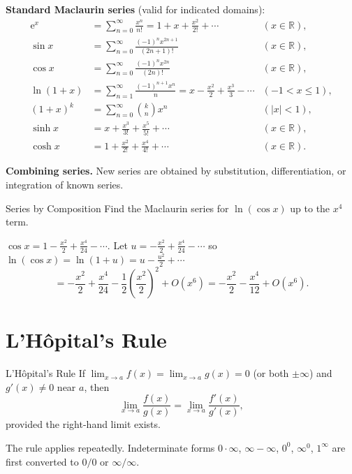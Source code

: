 \documentclass[12pt, a4paper]{book}
\newenvironment{keyresult}{%
  \begin{tcolorbox}[keystyle]%
}{%
  \end{tcolorbox}%
}
\newcommand{\R}{\mathbb{R}}
\newcommand{\e}{\mathrm{e}}
\begin{document}
\begin{keyresult}
\textbf{Standard Maclaurin series} (valid for indicated domains):
\begin{align*}
\e^x &= \sum_{n=0}^{\infty}\frac{x^n}{n!} = 1+x+\frac{x^2}{2!}+\cdots & (x\in\R),\\
\sin x &= \sum_{n=0}^{\infty}\frac{(-1)^n x^{2n+1}}{(2n+1)!} & (x\in\R),\\
\cos x &= \sum_{n=0}^{\infty}\frac{(-1)^n x^{2n}}{(2n)!} & (x\in\R),\\
\ln(1+x) &= \sum_{n=1}^{\infty}\frac{(-1)^{n+1}x^n}{n} = x-\frac{x^2}{2}+\frac{x^3}{3}-\cdots & (-1<x\leq 1),\\
(1+x)^k &= \sum_{n=0}^{\infty}\binom{k}{n}x^n & (|x|<1),\\
\sinh x &= x+\frac{x^3}{3!}+\frac{x^5}{5!}+\cdots & (x\in\R),\\
\cosh x &= 1+\frac{x^2}{2!}+\frac{x^4}{4!}+\cdots & (x\in\R).
\end{align*}
\end{keyresult}

\textbf{Combining series.} New series are obtained by substitution, differentiation, or integration of known series.

\begin{example}{Series by Composition}{}
Find the Maclaurin series for $\ln(\cos x)$ up to the $x^4$ term.

$\displaystyle \cos x = 1 - \frac{x^2}{2}+\frac{x^4}{24}-\cdots$. Let $\displaystyle u=-\frac{x^2}{2}+\frac{x^4}{24}-\cdots$ so $\displaystyle \ln(\cos x)=\ln(1+u)=u-\frac{u^2}{2}+\cdots$
\[
= -\frac{x^2}{2}+\frac{x^4}{24} - \frac{1}{2}\!\left(\frac{x^2}{2}\right)^2+O(x^6)
= -\frac{x^2}{2}-\frac{x^4}{12}+O(x^6).
\]
\end{example}

\section{L'H\^opital's Rule}

\begin{theorem}{L'H\^opital's Rule}{}
If $\displaystyle \lim_{x\to a}f(x)=\lim_{x\to a}g(x)=0$ (or both $\displaystyle \pm\infty$) and $\displaystyle g'(x)\neq0$ near $\displaystyle a$, then
\[
\lim_{x\to a}\frac{f(x)}{g(x)}=\lim_{x\to a}\frac{f'(x)}{g'(x)},
\]
provided the right-hand limit exists.
\end{theorem}

The rule applies repeatedly. Indeterminate forms $\displaystyle 0\cdot\infty$, $\displaystyle \infty-\infty$, $\displaystyle 0^0$, $\displaystyle \infty^0$, $\displaystyle 1^\infty$ are first converted to $\displaystyle 0/0$ or $\displaystyle \infty/\infty$.
\end{document}
